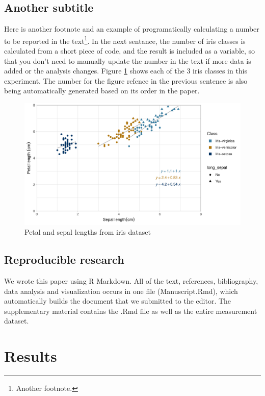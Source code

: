 \documentclass[]{elsarticle} %
\makeatletter
\def\maxwidth{\ifdim\Gin@nat@width>\linewidth\linewidth
\else\Gin@nat@width\fi}
\let\Oldincludegraphics\includegraphics
\renewcommand{\includegraphics}[1]{\Oldincludegraphics[width=\maxwidth]{#1}}
\makeatother
\begin{document}
\subsection{Another subtitle}\label{another-subtitle-2}

Here is another footnote and an example of programatically calculating a
number to be reported in the text\footnote{Another footnote.}. In the
next sentance, the number of iris classes is calculated from a short
piece of code, and the result is included as a variable, so that you
don't need to manually update the number in the text if more data is
added or the analysis changes. Figure \ref{fig:irises} shows each of the
3 iris classes in this experiment. The number for the figure refence in
the previous sentence is also being automatically generated based on its
order in the paper.

\begin{figure}
\centering
\includegraphics{Manuscript_files/figure-latex/irises-1.pdf}
\caption{\label{fig:irises}Petal and sepal lengths from iris dataset}
\end{figure}

\subsection{Reproducible research}\label{reproducible-research}

We wrote this paper using R Markdown. All of the text, references,
bibliography, data analysis and visualization occurs in one file
(Manuscript.Rmd), which automatically builds the document that we
submitted to the editor. The supplementary material contains the .Rmd
file as well as the entire measurement dataset.

\section{Results}\label{results}
\end{document}

